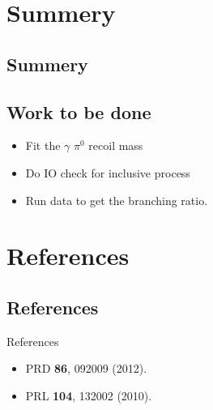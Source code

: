 \documentclass{beamer}
\begin{document}

\section{Summery}
\subsection{Summery}
\subsection{Work to be done}
\begin{frame}{}
\begin{itemize}
\item Fit the $\gamma$ $\pi^0$ recoil mass
\item Do IO check for inclusive process
\item Run data to get the branching ratio.
\end{itemize}
\end{frame}

\section{References}
\subsection{References}
\begin{frame}{References}
\begin{itemize}
\item  PRD \textbf{86}, 092009 (2012).
\item  PRL \textbf{104}, 132002 (2010).
\end{itemize}
\end{frame}
\end{document}
